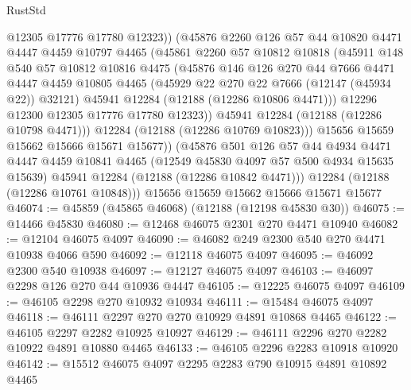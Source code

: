 \begin{lexlean}{RustStd}
\begin{coremodule}
                @12305
                @17776
                @17780
                @12323))
            (@45876
              @2260
              @126
              @57
              @44
              @10820
              @4471
              @4447
              @4459
              @10797
              @4465
              (@45861
                @2260
                @57
                @10812
                @10818
                (@45911
                  @148
                  @540
                  @57
                  @10812
                  @10816
                  @4475
                  (@45876
                    @146
                    @126
                    @270
                    @44
                    @7666
                    @4471
                    @4447
                    @4459
                    @10805
                    @4465
                    (@45929 @22 @270 @22 @7666 (@12147 (@45934 @22)) @32121)
                    @45941
                    @12284
                    (@12188 (@12286 @10806 @4471)))
                  @12296
                  @12300
                  @12305
                  @17776
                  @17780
                  @12323))
              @45941
              @12284
              (@12188 (@12286 @10798 @4471)))
            @12284
            (@12188 (@12286 @10769 @10823)))
          @15656
          @15659
          @15662
          @15666
          @15671
          @15677))
      (@45876
        @501
        @126
        @57
        @44
        @4934
        @4471
        @4447
        @4459
        @10841
        @4465
        (@12549 @45830 @4097 @57 @500 @4934 @15635 @15639)
        @45941
        @12284
        (@12188 (@12286 @10842 @4471)))
      @12284
      (@12188 (@12286 @10761 @10848)))
    @15656
    @15659
    @15662
    @15666
    @15671
    @15677
@46074 := @45859 (@45865 @46068) (@12188 (@12198 @45830 @30))
@46075 := @14466 @45830
@46080 := @12468 @46075 @2301 @270 @4471 @10940
@46082 := @12104 @46075 @4097
@46090 := @46082 @249 @2300 @540 @270 @4471 @10938 @4066 @590
@46092 := @12118 @46075 @4097
@46095 := @46092 @2300 @540 @10938
@46097 := @12127 @46075 @4097
@46103 := @46097 @2298 @126 @270 @44 @10936 @4447
@46105 := @12225 @46075 @4097
@46109 := @46105 @2298 @270 @10932 @10934
@46111 := @15484 @46075 @4097
@46118 := @46111 @2297 @270 @270 @10929 @4891 @10868 @4465
@46122 := @46105 @2297 @2282 @10925 @10927
@46129 := @46111 @2296 @270 @2282 @10922 @4891 @10880 @4465
@46133 := @46105 @2296 @2283 @10918 @10920
@46142 := @15512 @46075 @4097 @2295 @2283 @790 @10915 @4891 @10892 @4465

\end{coremodule}
\end{lexlean}
